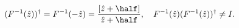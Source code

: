 \begin{equation*}
\nonumber
(F^{-1}(\hat z))^{\dagger}=F^{-1}(-\hat z)
=\frac{[\hat z+\half]}{\hat z+\half}, \quad
F^{-1}(\hat z)(F^{-1}(\hat z))^{\dagger}\ne I.
\end{equation*}

